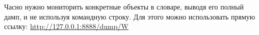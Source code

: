
Часно нужно мониторить конкретные объекты в словаре, выводя его полный дамп,
и не используя командную строку. Для этого можно использовать прямую ссылку:
\url{http://127.0.0.1:8888/dump/W}

